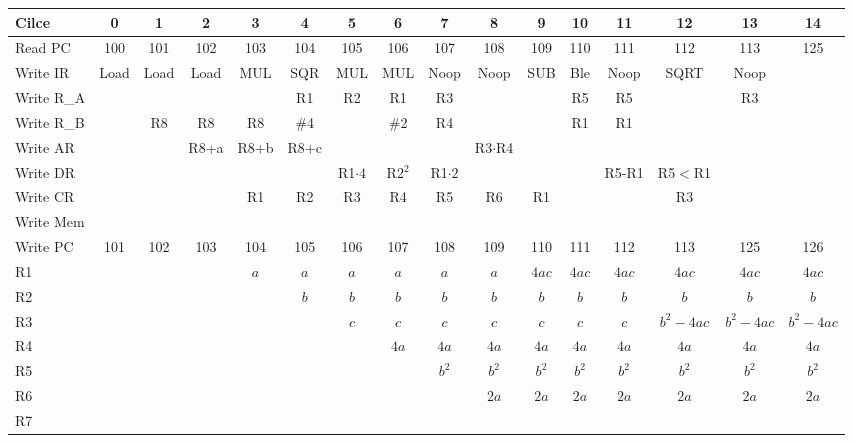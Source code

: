 \documentclass[border=2]{standalone}
\newcommand{\red}[1]{{\color{red}#1}}
\begin{document}
\begin{tabular}{|l|c	| c	| c	| c		| c		| c		| c		| c		| c		| c		| c	| c	| c			| c		| c |} \hline
Cilce		& 0	& 1	& 2	& 3		& 4		& 5		& 6		& 7		& 8		& 9		& 10	& 11	& 12			& 13		& 14		\\\hline\hline

Read PC		& 100	& 101	& 102	& 103		& 104		& 105		& 106		& 107		& 108		& 109		& 110	& 111	& 112			& 113		& 125		\\
Write IR	& Load	& Load	& Load	& MUL		& SQR		& MUL		& MUL		& Noop		& Noop		& SUB		& Ble	& Noop	& SQRT			& Noop		& 		\\\hline	

Write R\_A	&	&	&	&		& R1		& R2		& R1		& R3		&		&		& R5	& R5	&			& R3		&		\\
Write R\_B	&	& R8	& R8	& R8		& \#4		&		& \#2		& R4		&		&		& R1	& R1	&			&		&		\\\hline

Write AR	&	&	& R8+a	& R8+b		& R8+c		&		&		&		& R3$\cdot$R4	&		&	&	&			&		&		\\
Write DR	&	&	&	&		&		& R1$\cdot 4$	& R2$^2$	& R1$\cdot 2$	&		&		&	& R5-R1	& R5$<$R1		&		&		\\\hline

Write CR	&	&	&	& R1		& R2		& R3		& R4		& R5		& R6		& R1		&	&	& R3			&		&		\\
Write Mem	&	&	&	&		&		&		&		&		&		&		&	&	&			&		&		\\
Write PC	& 101	& 102	& 103	& 104		& 105		& 106		& 107		& 108		& 109		& 110		& 111	& 112	& 113			& 125		& 126		\\\hline\hline			

R1		&	&	&	& \red{$a$}	& $a$		& $a$		& $a$		& $a$		& $a$		& \red{$4ac$}	& $4ac$ & $4ac$	& $4ac$			& $4ac$		& $4ac$		\\
R2		&	&	&	&		& \red{$b$}	& $b$		& $b$		& $b$		& $b$		& $b$		& $b$	& $b$	& $b$			& $b$		& $b$		\\
R3		&	&	&	&		&		& \red{$c$}	& $c$		& $c$		& $c$		& $c$		& $c$	& $c$	& \red{$b^2 - 4ac$}	& $b^2 - 4ac$	& $b^2 - 4ac$	\\
R4		&	&	&	&		&		&		& \red{$4a$}	& $4a$		& $4a$		& $4a$		& $4a$	& $4a$	& $4a$			& $4a$		& $4a$		\\
R5		&	&	&	&		&		&		&		& \red{$b^2$}	& $b^2$		& $b^2$		& $b^2$	& $b^2$	& $b^2$			& $b^2$		& $b^2$		\\
R6		&	&	&	&		&		&		&		&		& \red{$2a$}	& $2a$		& $2a$	& $2a$	& $2a$			& $2a$		& $2a$		\\
R7		&	&	&	&		&		&		&		&		&		&		&	&	&			&		&		\\\hline
\end{tabular}
\end{document}

